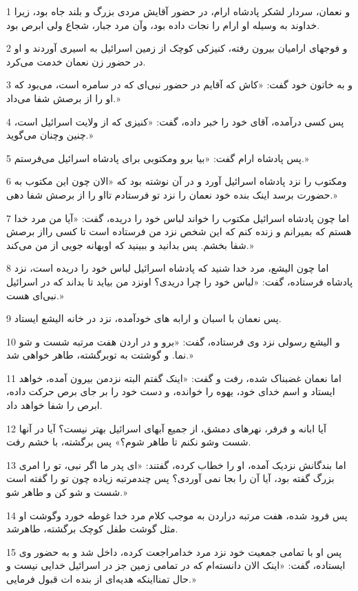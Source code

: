 \par 1 و نعمان، سردار لشکر پادشاه ارام، در حضور آقایش مردی بزرگ و بلند جاه بود، زیرا خداوند به وسیله او ارام را نجات داده بود، وآن مرد جبار، شجاع ولی ابرص بود.
\par 2 و فوجهای ارامیان بیرون رفته، کنیزکی کوچک از زمین اسرائیل به اسیری آوردند و او در حضور زن نعمان خدمت می‌کرد.
\par 3 و به خاتون خود گفت: «کاش که آقایم در حضور نبی‌ای که در سامره است، می‌بود که او را از برصش شفا می‌داد.»
\par 4 پس کسی درآمده، آقای خود را خبر داده، گفت: «کنیزی که از ولایت اسرائیل است، چنین وچنان می‌گوید.»
\par 5 پس پادشاه ارام گفت: «بیا برو ومکتوبی برای پادشاه اسرائیل می‌فرستم.»
\par 6 ومکتوب را نزد پادشاه اسرائیل آورد و در آن نوشته بود که «الان چون این مکتوب به حضورت برسد اینک بنده خود نعمان را نزد تو فرستادم تااو را از برصش شفا دهی.»
\par 7 اما چون پادشاه اسرائیل مکتوب را خواند لباس خود را دریده، گفت: «آیا من مرد خدا هستم که بمیرانم و زنده کنم که این شخص نزد من فرستاده است تا کسی رااز برصش شفا بخشم. پس بدانید و ببینید که اوبهانه جویی از من می‌کند.»
\par 8 اما چون الیشع، مرد خدا شنید که پادشاه اسرائیل لباس خود را دریده است، نزد پادشاه فرستاده، گفت: «لباس خود را چرا دریدی؟ اونزد من بیاید تا بداند که در اسرائیل نبی‌ای هست.»
\par 9 پس نعمان با اسبان و ارابه های خودآمده، نزد در خانه الیشع ایستاد.
\par 10 و الیشع رسولی نزد وی فرستاده، گفت: «برو و در اردن هفت مرتبه شست و شو نما. و گوشتت به توبرگشته، طاهر خواهی شد.»
\par 11 اما نعمان غضبناک شده، رفت و گفت: «اینک گفتم البته نزدمن بیرون آمده، خواهد ایستاد و اسم خدای خود، یهوه را خوانده، و دست خود را بر جای برص حرکت داده، ابرص را شفا خواهد داد.
\par 12 آیا ابانه و فرفر، نهرهای دمشق، از جمیع آبهای اسرائیل بهتر نیست؟ آیا در آنها شست وشو نکنم تا طاهر شوم؟» پس برگشته، با خشم رفت.
\par 13 اما بندگانش نزدیک آمده، او را خطاب کرده، گفتند: «ای پدر ما اگر نبی، تو را امری بزرگ گفته بود، آیا آن را بجا نمی آوردی؟ پس چندمرتبه زیاده چون تو را گفته است شست و شو کن و طاهر شو.»
\par 14 پس فرود شده، هفت مرتبه دراردن به موجب کلام مرد خدا غوطه خورد وگوشت او مثل گوشت طفل کوچک برگشته، طاهرشد.
\par 15 پس او با تمامی جمعیت خود نزد مرد خدامراجعت کرده، داخل شد و به حضور وی ایستاده، گفت: «اینک الان دانسته‌ام که در تمامی زمین جز در اسرائیل خدایی نیست و حال تمنااینکه هدیه‌ای از بنده ات قبول فرمایی.»
